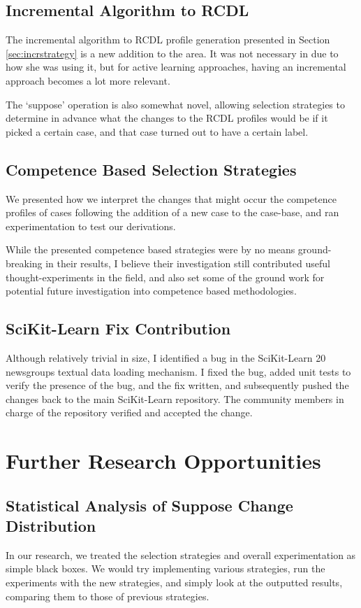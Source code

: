 \documentclass[a4paper,11pt]{report}
\begin{document}
\subsection{Incremental Algorithm to RCDL}

The incremental algorithm to RCDL profile generation presented in Section \ref{sec:incrstrategy} is a new addition to the area. It was not necessary in \citet{Delany2009} due to how she was using it, but for active learning approaches, having an incremental approach becomes a lot more relevant. 

The `suppose' operation is also somewhat novel, allowing selection strategies to determine in advance what the changes to the RCDL profiles would be if it picked a certain case, and that case turned out to have a certain label.

\subsection{Competence Based Selection Strategies}

We presented how we interpret the changes that might occur the competence profiles of cases following the addition of a new case to the case-base, and ran experimentation to test our derivations.

While the presented competence based strategies were by no means ground-breaking in their results, I believe their investigation still contributed useful thought-experiments in the field, and also set some of the ground work for potential future investigation into competence based methodologies.

\subsection{SciKit-Learn Fix Contribution}

Although relatively trivial in size, I identified a bug in the SciKit-Learn 20 newsgroups textual data loading mechanism. I fixed the bug, added unit tests to verify the presence of the bug, and the fix written, and subsequently pushed the changes back to the main SciKit-Learn repository. The community members in charge of the repository verified and accepted the change.


\section{Further Research Opportunities}
\subsection{Statistical Analysis of Suppose Change Distribution}
In our research, we treated the selection strategies and overall experimentation as simple black boxes. We would try implementing various strategies, run the experiments with the new strategies, and simply look at the outputted results, comparing them to those of previous strategies.
\end{document}
